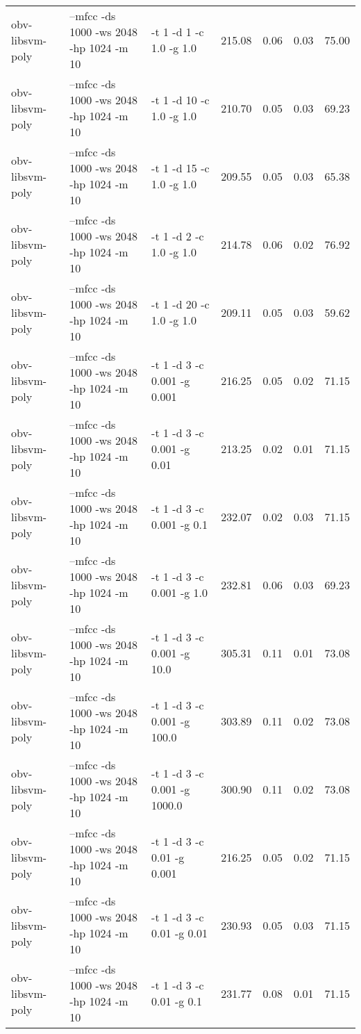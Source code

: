 \documentclass[11pt,a4paper]{article}
\begin{document}
\begin{tabular}{lllrrrr}
 obv-libsvm-poly  &  --mfcc -ds 1000 -ws 2048 -hp 1024 -m 10  &  -t 1 -d 1  -c 1.0    -g 1.0     &  215.08  &  0.06  &  0.03  &  75.00  \\
 obv-libsvm-poly  &  --mfcc -ds 1000 -ws 2048 -hp 1024 -m 10  &  -t 1 -d 10 -c 1.0    -g 1.0     &  210.70  &  0.05  &  0.03  &  69.23  \\
 obv-libsvm-poly  &  --mfcc -ds 1000 -ws 2048 -hp 1024 -m 10  &  -t 1 -d 15 -c 1.0    -g 1.0     &  209.55  &  0.05  &  0.03  &  65.38  \\
 obv-libsvm-poly  &  --mfcc -ds 1000 -ws 2048 -hp 1024 -m 10  &  -t 1 -d 2  -c 1.0    -g 1.0     &  214.78  &  0.06  &  0.02  &  76.92  \\
 obv-libsvm-poly  &  --mfcc -ds 1000 -ws 2048 -hp 1024 -m 10  &  -t 1 -d 20 -c 1.0    -g 1.0     &  209.11  &  0.05  &  0.03  &  59.62  \\
 obv-libsvm-poly  &  --mfcc -ds 1000 -ws 2048 -hp 1024 -m 10  &  -t 1 -d 3  -c 0.001  -g 0.001   &  216.25  &  0.05  &  0.02  &  71.15  \\
 obv-libsvm-poly  &  --mfcc -ds 1000 -ws 2048 -hp 1024 -m 10  &  -t 1 -d 3  -c 0.001  -g 0.01    &  213.25  &  0.02  &  0.01  &  71.15  \\
 obv-libsvm-poly  &  --mfcc -ds 1000 -ws 2048 -hp 1024 -m 10  &  -t 1 -d 3  -c 0.001  -g 0.1     &  232.07  &  0.02  &  0.03  &  71.15  \\
 obv-libsvm-poly  &  --mfcc -ds 1000 -ws 2048 -hp 1024 -m 10  &  -t 1 -d 3  -c 0.001  -g 1.0     &  232.81  &  0.06  &  0.03  &  69.23  \\
 obv-libsvm-poly  &  --mfcc -ds 1000 -ws 2048 -hp 1024 -m 10  &  -t 1 -d 3  -c 0.001  -g 10.0    &  305.31  &  0.11  &  0.01  &  73.08  \\
 obv-libsvm-poly  &  --mfcc -ds 1000 -ws 2048 -hp 1024 -m 10  &  -t 1 -d 3  -c 0.001  -g 100.0   &  303.89  &  0.11  &  0.02  &  73.08  \\
 obv-libsvm-poly  &  --mfcc -ds 1000 -ws 2048 -hp 1024 -m 10  &  -t 1 -d 3  -c 0.001  -g 1000.0  &  300.90  &  0.11  &  0.02  &  73.08  \\
 obv-libsvm-poly  &  --mfcc -ds 1000 -ws 2048 -hp 1024 -m 10  &  -t 1 -d 3  -c 0.01   -g 0.001   &  216.25  &  0.05  &  0.02  &  71.15  \\
 obv-libsvm-poly  &  --mfcc -ds 1000 -ws 2048 -hp 1024 -m 10  &  -t 1 -d 3  -c 0.01   -g 0.01    &  230.93  &  0.05  &  0.03  &  71.15  \\
 obv-libsvm-poly  &  --mfcc -ds 1000 -ws 2048 -hp 1024 -m 10  &  -t 1 -d 3  -c 0.01   -g 0.1     &  231.77  &  0.08  &  0.01  &  71.15  \\

\end{tabular}
\end{document}

